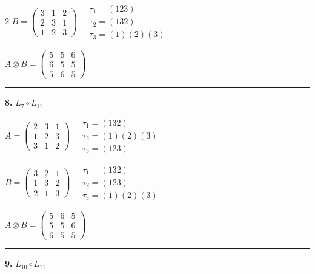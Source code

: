 \begin{multicols}{2}
$B = \begin{pmatrix} 3 & 1 & 2 \\ 2 & 3 & 1 \\ 1 & 2 & 3 \end{pmatrix} \quad \begin{matrix} \tau_{1}=(1 2 3) \\ \tau_{2}=(1 3 2) \\ \tau_{3}=(1)(2)(3) \end{matrix}$

$A \otimes B = \begin{pmatrix} 5 & 5 & 6 \\ 6 & 5 & 5 \\ 5 & 6 & 5 \end{pmatrix}$

\vspace{0.3em}
\hrule
\vspace{0.3em}

\noindent\textbf{8.} $L_{7} \circ L_{11}$

$A = \begin{pmatrix} 2 & 3 & 1 \\ 1 & 2 & 3 \\ 3 & 1 & 2 \end{pmatrix} \quad \begin{matrix} \tau_{1}=(1 3 2) \\ \tau_{2}=(1)(2)(3) \\ \tau_{3}=(1 2 3) \end{matrix}$

$B = \begin{pmatrix} 3 & 2 & 1 \\ 1 & 3 & 2 \\ 2 & 1 & 3 \end{pmatrix} \quad \begin{matrix} \tau_{1}=(1 3 2) \\ \tau_{2}=(1 2 3) \\ \tau_{3}=(1)(2)(3) \end{matrix}$

$A \otimes B = \begin{pmatrix} 5 & 6 & 5 \\ 5 & 5 & 6 \\ 6 & 5 & 5 \end{pmatrix}$

\vspace{0.3em}
\hrule
\vspace{0.3em}

\noindent\textbf{9.} $L_{10} \circ L_{11}$


\end{multicols}
